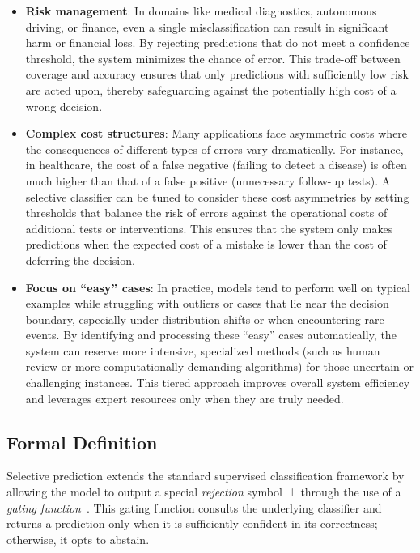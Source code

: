\begin{itemize}
    \item \textbf{Risk management}: In domains like medical diagnostics, autonomous driving, or finance, even a single misclassification can result in significant harm or financial loss. By rejecting predictions that do not meet a confidence threshold, the system minimizes the chance of error. This trade-off between coverage and accuracy ensures that only predictions with sufficiently low risk are acted upon, thereby safeguarding against the potentially high cost of a wrong decision.

    \item \textbf{Complex cost structures}: Many applications face asymmetric costs where the consequences of different types of errors vary dramatically. For instance, in healthcare, the cost of a false negative (failing to detect a disease) is often much higher than that of a false positive (unnecessary follow-up tests). A selective classifier can be tuned to consider these cost asymmetries by setting thresholds that balance the risk of errors against the operational costs of additional tests or interventions. This ensures that the system only makes predictions when the expected cost of a mistake is lower than the cost of deferring the decision.

    \item \textbf{Focus on ``easy'' cases}: In practice, models tend to perform well on typical examples while struggling with outliers or cases that lie near the decision boundary, especially under distribution shifts or when encountering rare events. By identifying and processing these ``easy'' cases automatically, the system can reserve more intensive, specialized methods (such as human review or more computationally demanding algorithms) for those uncertain or challenging instances. This tiered approach improves overall system efficiency and leverages expert resources only when they are truly needed.
\end{itemize}

\subsection{Formal Definition} 

Selective prediction extends the standard supervised classification framework by allowing the model to output a special \emph{rejection} symbol~$\bot$ through the use of a \textit{gating function}~\citep{yaniv2010riskcoveragecurve}. This gating function consults the underlying classifier and returns a prediction only when it is sufficiently confident in its correctness; otherwise, it opts to abstain. 

